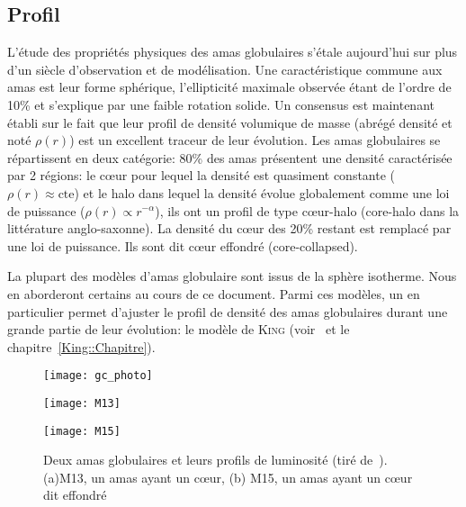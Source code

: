 		\subsection{Profil}

			L'étude des propriétés physiques des amas globulaires s'étale aujourd'hui
			sur plus d'un siècle d'observation et de modélisation. Une caractéristique
			commune aux amas est leur forme sphérique, l'ellipticité maximale observée
			étant de l'ordre de 10\% et s'explique par une faible rotation solide. Un
			consensus est maintenant établi sur le fait que leur profil de densité
			volumique de masse (abrégé densité et noté $\rho(r)$) est un excellent
			traceur de leur évolution. Les amas globulaires se répartissent en deux
			catégorie: 80\% des amas présentent une densité caractérisée par 2 régions:
			le cœur pour lequel la densité est quasiment constante ($\rho(r) \approx
			\mathrm{cte}$) et le halo dans lequel la densité évolue globalement comme
			une loi de puissance ($\rho(r) \propto r^{-\alpha}$), ils ont un profil de
			type cœur-halo (core-halo dans la littérature anglo-saxonne). La densité du
			cœur des 20\% restant est remplacé par une loi de puissance. Ils sont dit
			cœur effondré (core-collapsed).

			La plupart des modèles d'amas globulaire sont issus de la sphère isotherme. Nous en
			aborderont certains au cours de ce document. Parmi ces modèles, un en particulier
			permet d'ajuster le profil de densité des amas globulaires durant une grande
			partie de leur évolution: le modèle de \textsc{King}
			(voir~\cite{1966AJ.....71...64K} et le chapitre~\ref{King::Chapitre}).

			\begin{figure}[h]
				\begin{center}
					\texttt{[image: gc\_photo]}
				\end{center}
				\begin{minipage}{0.45\textwidth}
					\begin{center}
						\texttt{[image: M13]}
					\end{center}
				\end{minipage}\hfill
				\begin{minipage}{0.45\textwidth}
					\begin{center}
						\texttt{[image: M15]}
					\end{center}
				\end{minipage}
				\caption{\label{Fig::Intro::images}Deux amas globulaires et leurs profils de luminosité (tiré de~\cite{2010A&A...522A..71J}). (a)M13, un amas ayant un cœur, (b) M15, un amas ayant un cœur dit effondré}
			\end{figure}

